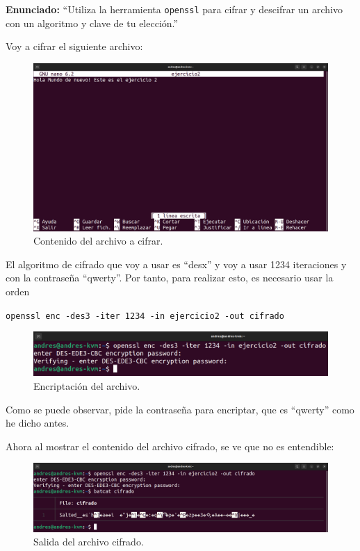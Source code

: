 \documentclass{article}
\begin{document}
\textbf{Enunciado: }``Utiliza la herramienta \texttt{openssl} para cifrar y descifrar un archivo con un algoritmo y clave de tu elección.''

\bigskip

Voy a cifrar el siguiente archivo:

\begin{figure}[H]
    \includegraphics[width=\textwidth]{imagenes/Captura desde 2022-10-19 17-33-08.png}
    \caption{Contenido del archivo a cifrar.}
\end{figure}

El algoritmo de cifrado que voy a usar es ``desx'' y voy a usar 1234 iteraciones y con la contraseña ``qwerty''. Por tanto, para realizar esto, es necesario usar la orden 

\verb|openssl enc -des3 -iter 1234 -in ejercicio2 -out cifrado|

\begin{figure}[H]
    \includegraphics[width=\textwidth]{imagenes/Captura desde 2022-10-19 17-44-41.png}
    \caption{Encriptación del archivo.}
\end{figure}

Como se puede observar, pide la contraseña para encriptar, que es ``qwerty'' como he dicho antes. 

\bigskip

Ahora al mostrar el contenido del archivo cifrado, se ve que no es entendible:

\begin{figure}[H]
    \includegraphics[width=\textwidth]{imagenes/Captura desde 2022-10-19 17-44-49.png}
    \caption{Salida del archivo cifrado.}
\end{figure}
\end{document}
